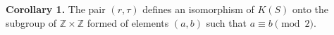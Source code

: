 \textbf{Corollary 1.} The pair $(r, \tau)$ defines an isomorphism of $K(S)$ onto the subgroup of $\mathbb{Z} \times \mathbb{Z}$ formed of elements $(a,b)$ such that $a \equiv b \pmod{2}$.
